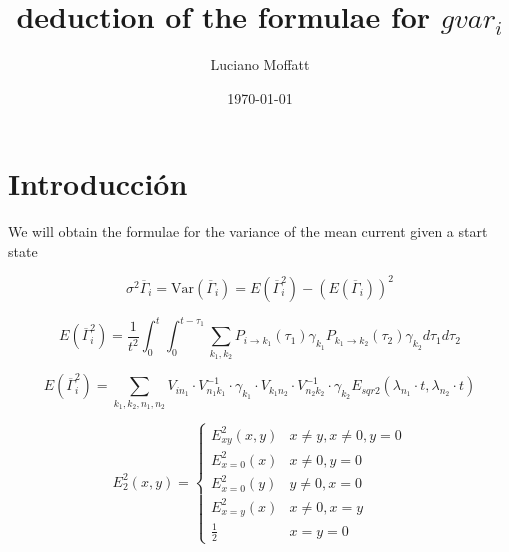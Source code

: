 \documentclass{article} %
\begin{document}
	
	\title{deduction of the formulae for $gvar_i$}
	\author{Luciano Moffatt}
	\date{\today}
	\maketitle
	\section{Introducción}
	
   We will obtain the formulae for the variance of the mean current given a start state
   
   
 \begin{equation}
 	\sigma^2 \overline{\Gamma}_{i}=\text{Var}(\overline{\Gamma}_{i}) = E(\overline{\Gamma}_{i}^2) - \left( E(\overline{\Gamma}_{i}) \right)^2
 	\label{eq:sigma_gamma_expression}
 \end{equation} 
	
\begin{equation}
	E(\overline{\Gamma}_{i}^2) = \frac{1}{t^2} \int_0^t \int_0^{t-\tau_1} \sum_{k_1, k_2} P_{i \rightarrow k_1}(\tau_1) \gamma_{k_1} P_{k_1 \rightarrow k_2}(\tau_2) \gamma_{k_2}  d\tau_1 d\tau_2
	\label{eq:sqr_gamma_integral}
\end{equation}
	
\begin{equation}
	E(\overline{\Gamma}_{i }^2) =  \sum_{k_1, k_2, n_1, n_2} V_{i n_1} \cdot V^{-1}_{n_1 k_1} \cdot \gamma_{k_1} \cdot V_{k_1 n_2} \cdot V^{-1}_{n_2 k_2} \cdot \gamma_{k_2}  E_{sqr2}(\lambda_{n_1} \cdot t, \lambda_{n_2} \cdot t)
	\label{eq:sqr_gamma_formula}
\end{equation}
	
\begin{equation}
	E_2^2(x,y)= 
	\begin{cases}
		E^2_{xy}(x,y) & x\neq y, x\neq 0,y=0 \\
		E^2_{x=0}(x) & x\neq 0, y=0 \\
		E^2_{x=0}(y) & y\neq 0, x=0 \\
		E^2_{x=y}(x) & x\neq 0, x=y \\
		\frac{1}{2} & x=y=0
	\end{cases}
	\label{eq:E_2}
\end{equation}
	
	
	
\end{document}
